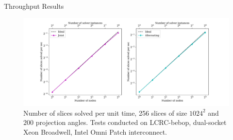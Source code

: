 \documentclass{beamer}
\begin{document}

\begin{frame}{Throughput Results}
	\begin{center}
		\begin{figure}
			\includegraphics[scale=0.3125]{figures/throughput}
			\caption{Number of slices solved per unit time, 256 slices of size $1024^2$ and $200$ projection angles. Tests conducted on LCRC-bebop, dual-socket Xeon Broadwell, Intel Omni Patch interconnect.}
		\end{figure}
	\end{center}
\end{frame}
\end{document}
